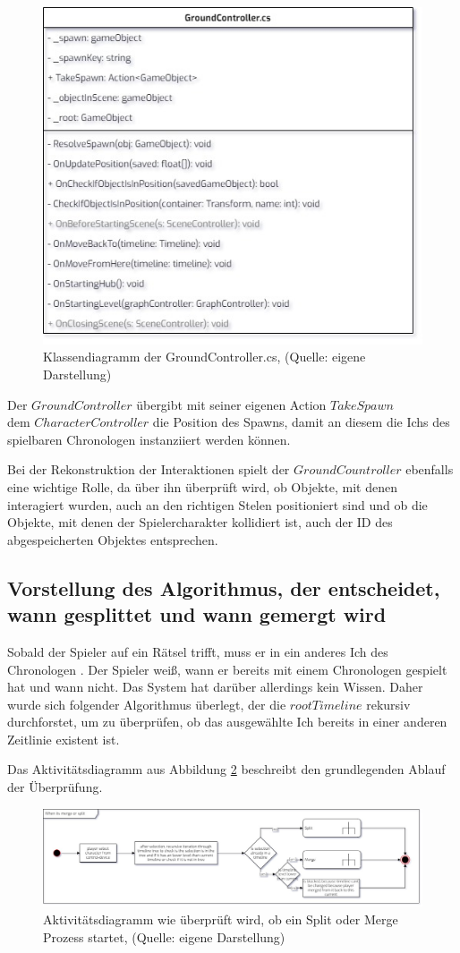 \begin{figure}[ht]
\centering
\includegraphics[width=0.6\linewidth]{content/pictures/GroundController.jpg}
\caption{Klassendiagramm der GroundController.cs, (Quelle: eigene Darstellung)}
\label{fig:groundCOntroller-cs}
\end{figure}

Der $GroundController$ übergibt mit seiner eigenen Action $TakeSpawn$ \\ dem $CharacterController$ die Position des Spawns, damit an diesem die Ichs des spielbaren Chronologen instanziiert werden können.

Bei der Rekonstruktion der Interaktionen spielt der $GroundCountroller$ ebenfalls eine wichtige Rolle, da über ihn überprüft wird, ob Objekte, mit denen interagiert wurden, auch an den richtigen Stelen positioniert sind und ob die Objekte, mit denen der Spielercharakter kollidiert ist, auch der \ac{ID} des abgespeicherten Objektes entsprechen.

\subsection{Vorstellung des Algorithmus, der entscheidet, wann gesplittet und wann gemergt wird}\label{sec:core_algo_split_merge}
Sobald der Spieler auf ein Rätsel trifft, muss er in ein anderes Ich des Chronologen . Der Spieler weiß, wann er bereits mit einem Chronologen gespielt hat und wann nicht. Das System hat darüber allerdings kein Wissen. Daher wurde sich folgender Algorithmus überlegt, der die $rootTimeline$ rekursiv durchforstet, um zu überprüfen, ob das ausgewählte Ich bereits in einer anderen Zeitlinie existent ist.

Das Aktivitätsdiagramm aus Abbildung \ref{fig:check-if-split-merge} beschreibt den grundlegenden Ablauf der Überprüfung.
\begin{figure}[ht]
\centering
\includegraphics[width=1\linewidth]{content/pictures/CheckIfSplit.jpg}
\caption{Aktivitätsdiagramm wie überprüft wird, ob ein Split oder Merge Prozess startet, (Quelle: eigene Darstellung)}
\label{fig:check-if-split-merge}
\end{figure}

